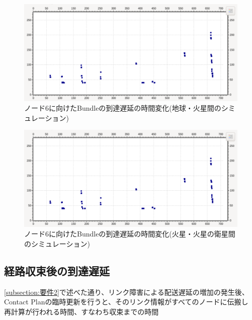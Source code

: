 \begin{figure}[tbh]
    \centering
    \includegraphics[width=0.7\textheight]{img/thesis_sample_delay_time.pdf}
    \caption{ノード6に向けたBundleの到達遅延の時間変化(地球・火星間のシミュレーション)}
    \label{fig:delay_time_variation_earth_mars}
    \begin{minipage}{\textwidth}
        \raggedright
    \end{minipage}
\end{figure}

\begin{figure}[tbh]
    \centering
    \includegraphics[width=0.7\textheight]{img/thesis_sample_delay_time.pdf}
    \caption{ノード6に向けたBundleの到達遅延の時間変化(火星・火星の衛星間のシミュレーション)}
    \label{fig:delay_time_variation_mars_marssat}
    \begin{minipage}{\textwidth}
        \raggedright
    \end{minipage}
\end{figure}

\subsection{経路収束後の到達遅延}
\label{subsection:経路収束後の到達遅延}
\ref{subsection:要件2}で述べた通り、リンク障害による配送遅延の増加の発生後、
Contact Planの臨時更新を行うと、そのリンク情報がすべてのノードに伝搬し
再計算が行われる時間、すなわち収束までの時間


